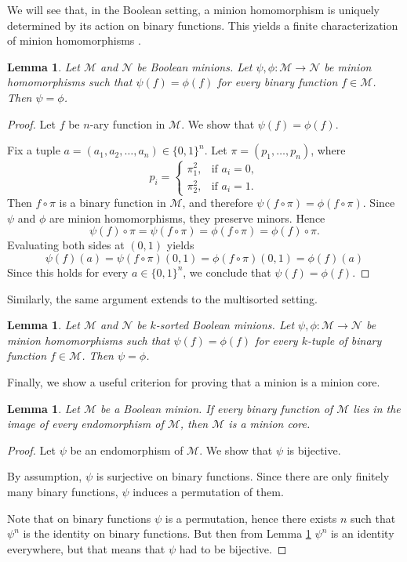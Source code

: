 \documentclass{amsart}
\numberwithin{equation}{section}
\theoremstyle{plain}
\newtheorem{lemma}[theorem]{Lemma}
\theoremstyle{definition}
\def\minion#1{\mathcal{#1}}
\begin{document}
We will see that, in the Boolean setting, a minion homomorphism is uniquely determined by its action on binary functions. This yields a finite characterization of minion homomorphisms \cite{kapytka}.

\begin{lemma}
  \label{bin-equal}
Let $\minion{M}$ and $\minion{N}$ be Boolean minions. Let $\psi,\phi\colon \minion{M}\to\minion{N}$ be minion homomorphisms such that $\psi(f)=\phi(f)$ for every binary function $f\in\minion{M}$. Then $\psi=\phi$.
\end{lemma}
\begin{proof}
  Let $f$ be $n$-ary function in $\minion{M}$. We show that $\psi(f)=\phi(f)$. 
  
  Fix a tuple $a=(a_1,a_2,\dots,a_n)\in\{0,1\}^n$. 
  Let $\pi=(p_1,\dots,p_n)$, where 
  $$p_i= \begin{cases} \pi_1^2,& \text{if } a_i=0,\\ \pi_2^2,& \text{if } a_i=1. \end{cases} $$
  Then $f\circ\pi$ is a binary function in $\minion{M}$, and therefore $\psi(f\circ\pi)=\phi(f\circ\pi)$. 
  Since $\psi$ and $\phi$ are minion homomorphisms, they preserve minors. Hence
  $$\psi(f)\circ\pi = \psi(f\circ\pi) = \phi(f\circ\pi) = \phi(f)\circ\pi.$$ Evaluating both sides at $(0,1)$ yields
  $$\psi(f)(a) = \psi(f\circ\pi)(0,1) = \phi(f\circ\pi)(0,1) = \phi(f)(a)$$
Since this holds for every $a\in\{0,1\}^n$, we conclude that $\psi(f)=\phi(f)$. 
\end{proof}

Similarly, the same argument extends to the multisorted setting.

\begin{lemma}
Let $\minion{M}$ and $\minion{N}$ be $k$-sorted Boolean minions. Let $\psi,\phi\colon\minion{M}\to\minion{N}$ be minion homomorphisms such that
 $\psi(f)=\phi(f)$ for every $k$-tuple of binary function $f\in\minion{M}$. Then $\psi=\phi$.
\end{lemma}

Finally, we show a useful criterion for proving that a minion is a minion core.

\begin{lemma}
  Let $\minion{M}$ be a Boolean minion. If every binary function of $\minion{M}$ lies in the image of every endomorphism of $\minion{M}$, then $\minion{M}$ is a minion core.
\end{lemma}
\begin{proof}
  Let $\psi$ be an endomorphism of $\minion{M}$. We show that $\psi$ is bijective.

  By assumption, $\psi$ is surjective on binary functions. Since there are only finitely many binary functions, $\psi$ induces a permutation of them.

  Note that on binary functions $\psi$ is a permutation, hence there exists $n$ such that $\psi^n$ is the identity on binary functions. But then from Lemma \ref{bin-equal} $\psi^n$ is an identity everywhere, but that means that $\psi$ had to be bijective.  
\end{proof}
\end{document}
